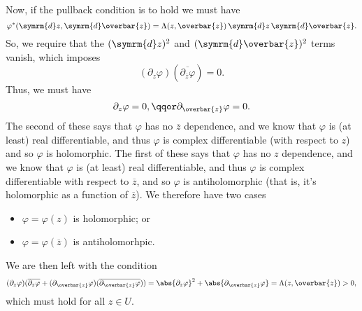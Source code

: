 \documentclass[fleqn]{NotesClass}
\renewcommand{\dd}[1]{\,\symrm{d}#1}
\renewcommand{\dl}[1]{\symrm{d}#1}
\begin{document}
    Now, if the pullback condition is to hold we must have
    \begin{equation}
        \varphi^*(\dl{z}, \dl{\overbar{z}}) = \Lambda(z, \overbar{z}) \dd{z} \dd{\overbar{z}}.
    \end{equation}
    So, we require that the \((\dl{z})^2\) and \((\dl{\overbar{z}})^2\) terms vanish, which imposes
    \begin{equation}
        (\partial_z \varphi) (\overline{\partial_{\overbar{z}} \varphi}) = 0.
    \end{equation}
    Thus, we must have
    \begin{equation}
        \partial_z \varphi = 0, \qqor \partial_{\overbar{z}} \varphi = 0.
    \end{equation}
    The second of these says that \(\varphi\) has no \(\overbar{z}\) dependence, and we know that \(\varphi\) is (at least) real differentiable, and thus \(\varphi\) is complex differentiable (with respect to \(z\)) and so \(\varphi\) is holomorphic.
    The first of these says that \(\varphi\) has no \(z\) dependence, and we know that \(\varphi\) is (at least) real differentiable, and thus \(\varphi\) is complex differentiable with respect to \(\overbar{z}\), and so \(\varphi\) is antiholomorphic (that is, it's holomorphic as a function of \(\overbar{z}\)).
    We therefore have two cases
    \begin{itemize}
        \item \(\varphi = \varphi(z)\) is holomorphic; or
        \item \(\varphi = \varphi(\overbar{z})\) is antiholomorhpic.
    \end{itemize}
    
    We are then left with the condition
    \begin{equation}
        (\partial_z\varphi)(\overline{\partial_z\varphi} + (\partial_{\overbar{z}} \varphi) (\overline{\partial_{\overbar{z}} \varphi})) = \abs{\partial_z \varphi}^2 + \abs{\partial_{\overbar{z}} \varphi} = \Lambda(z, \overbar{z}) > 0,
    \end{equation}
    which must hold for all \(z \in U\).
    
\end{document}
